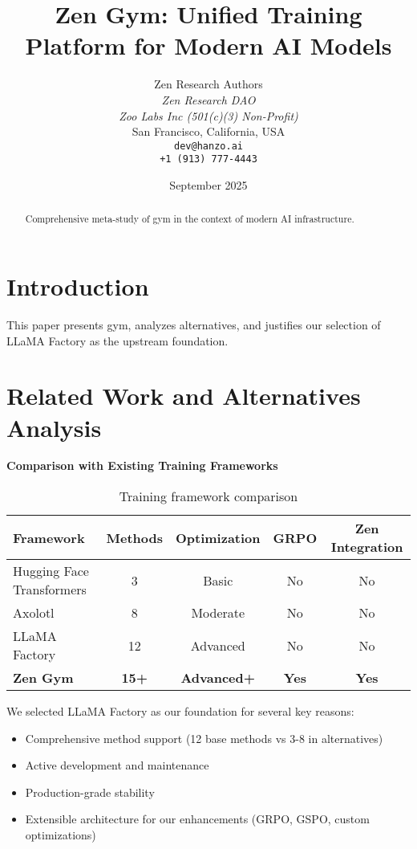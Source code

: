 \documentclass[11pt,a4paper]{article}
\title{Zen Gym: Unified Training Platform for Modern AI Models}
\author{
    Zen Research Authors \\
    \textit{Zen Research DAO} \\
    \textit{Zoo Labs Inc (501(c)(3) Non-Profit)} \\
    San Francisco, California, USA \\
    \texttt{dev@hanzo.ai} \\
    \texttt{+1 (913) 777-4443}
}
\date{September 2025}
\begin{document}
\maketitle

\begin{abstract}
Comprehensive meta-study of gym in the context of modern AI infrastructure.
\end{abstract}

\section{Introduction}
This paper presents gym, analyzes alternatives, and justifies our selection of LLaMA Factory as the upstream foundation.

\section{Related Work and Alternatives Analysis}
\textbf{Comparison with Existing Training Frameworks}

\begin{table}[h]
\centering
\begin{tabular}{@{}lcccc@{}}
\toprule
\textbf{Framework} & \textbf{Methods} & \textbf{Optimization} & \textbf{GRPO} & \textbf{Zen Integration} \\
\midrule
Hugging Face Transformers & 3 & Basic & No & No \\
Axolotl & 8 & Moderate & No & No \\
LLaMA Factory & 12 & Advanced & No & No \\
\textbf{Zen Gym} & \textbf{15+} & \textbf{Advanced+} & \textbf{Yes} & \textbf{Yes} \\
\bottomrule
\end{tabular}
\caption{Training framework comparison}
\label{tab:framework_comparison}
\end{table}

We selected LLaMA Factory as our foundation for several key reasons:
\begin{itemize}
    \item Comprehensive method support (12 base methods vs 3-8 in alternatives)
    \item Active development and maintenance
    \item Production-grade stability
    \item Extensible architecture for our enhancements (GRPO, GSPO, custom optimizations)
\end{itemize}
\end{document}
